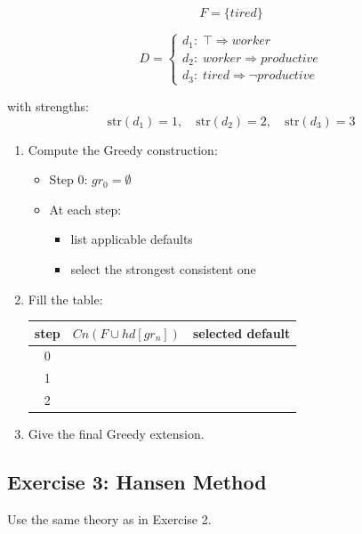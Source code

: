 \documentclass[11pt]{article}
\begin{document}
\[
F = \{ tired \}
\]

\[
D =
\begin{cases}
d_1: \; \top \Rightarrow worker \\
d_2: \; worker \Rightarrow productive \\
d_3: \; tired \Rightarrow \neg productive
\end{cases}
\]

with strengths:
\[
\text{str}(d_1) = 1, \quad \text{str}(d_2) = 2, \quad \text{str}(d_3) = 3
\]

\begin{enumerate}
    \item Compute the Greedy construction:
    \begin{itemize}
        \item Step 0: $gr_0 = \emptyset$
        \item At each step:
        \begin{itemize}
            \item list applicable defaults
            \item select the strongest consistent one
        \end{itemize}
    \end{itemize}

    \item Fill the table:

    \begin{center}
    \begin{tabular}{c|c|c}
        step & $Cn(F \cup hd[gr_n])$ & selected default \\
        \hline
        0 & & \\
        1 & & \\
        2 & & \\
    \end{tabular}
    \end{center}

    \item Give the final Greedy extension.
\end{enumerate}

\subsection{Exercise 3: Hansen Method}

Use the same theory as in Exercise 2.
\end{document}

